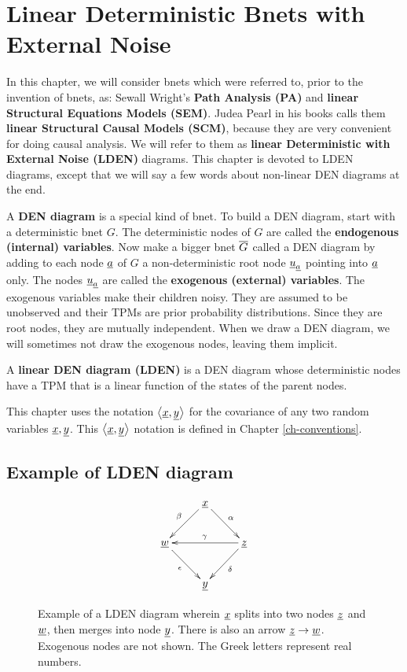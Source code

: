 \chapter{Linear Deterministic Bnets 
with External 
Noise}\label{ch-linear-sys}

In this chapter, we will consider 
bnets which were referred to,
prior to the invention of bnets, as:
Sewall Wright's {\bf Path Analysis (PA)}
 and
{\bf linear Structural Equations Models (SEM)}.
Judea Pearl in his
books calls them
{\bf linear Structural Causal Models (SCM)},
because they are very 
convenient for doing causal analysis.
We will refer  to
them as {\bf linear  Deterministic with 
External Noise
 (LDEN)} diagrams.
This chapter
is devoted to LDEN diagrams,
except that we will
say a few words
about non-linear DEN
diagrams at the end.


A {\bf DEN diagram}
is a special kind of bnet.
To 
build a DEN diagram,
start with a 
deterministic bnet $G$.
The deterministic
nodes of $G$ are called
the {\bf endogenous (internal) variables}.
Now make a bigger bnet $\overline{G}$
called a DEN diagram
by 
adding to each node ${\underline{a}}$ of $G$ a
non-deterministic  
root node ${\underline{u}}_{\underline{a}}$
pointing into ${\underline{a}}$ only.
The nodes ${\underline{u}}_{\underline{a}}$ are called
the {\bf exogenous (external) variables}.
The exogenous
variables make their children noisy.
They are assumed 
to be unobserved
and their TPMs are prior
probability distributions.
Since they are 
root nodes, they are 
mutually independent.
When we
draw
a DEN diagram,
we will sometimes
not draw the exogenous nodes,
leaving them implicit.

A {\bf linear DEN diagram (LDEN)} is 
a DEN diagram
whose deterministic nodes
have a TPM that is a linear 
function of the states
of the parent nodes.

This chapter 
uses the notation
$\left\langle{\underline{x}}, {\underline{y}}\right\rangle$
for the
covariance
of any two random variables ${\underline{x}}, {\underline{y}}$.
This $\left\langle{\underline{x}}, {\underline{y}}\right\rangle$ notation
is defined in Chapter \ref{ch-conventions}.


\section{Example
of LDEN diagram}


\begin{figure}[h!]
$$\xymatrix{
&\rvx\ar[dl]_\beta\ar[dr]^\alp
\\
\rvw\ar[dr]_\epsilon&&\rvz\ar[ll]_\gamma\ar[dl]^\delta
\\
&\rvy
}$$
\caption{
Example of a LDEN diagram wherein
${\underline{x}}$ splits
into two nodes ${\underline{z}}$
and ${\underline{w}}$,
then merges into node ${\underline{y}}$.
There is also an arrow
${\underline{z}}\rightarrow {\underline{w}}$.
Exogenous
nodes are not shown.
The Greek letters
represent 
real numbers.
}
\label{fig-scm-diamond}
\end{figure}

